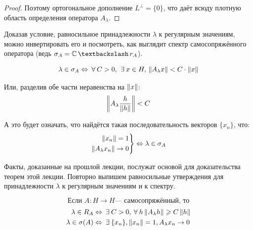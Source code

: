 \documentclass[12pt]{article}
\begin{document}
\begin{proof}
			Поэтому ортогональное дополнение $L^{\perp} = \{0\}$, что даёт всюду плотную область определения оператора $A_{\lambda}$.
		\end{proof}
	
		Доказав условие, равносильное принадлежности $\lambda$ к регулярным значениям, можно инвертировать его и посмотреть,
		как выглядит спектр самосопряжённого оператора
		(ведь $\sigma_A = \mathbb{C} \,\textbackslash\, r_A$).
	
		$$\lambda \in \sigma_A \Leftrightarrow \forall C > 0,\, \exists x \in H,\, \norm{A_{\lambda}x} < C\cdot\norm{x}$$
	
		Или, разделив обе части неравенства на $\left\| x \right\|$:
		$$\left\| A_{\lambda} \dfrac{h}{\left\| h \right\|} \right\| < C$$
	
		А это будет означать, что найдётся такая последовательность векторов $\{x_n\}$, что:
		$$
			\left.
			\begin{aligned}
				\left\| x_n \right\| = 1 \\
				\left\| A_{\lambda}x_n \right\| \rightarrow 0
			\end{aligned}
			\right\}
			\Leftrightarrow
			\lambda \in \sigma_A
		$$


		Факты, доказанные на прошлой лекции, послужат основой для доказательства теорем этой лекции.
		Повторно выпишем равносильные утверждения для принадлежности $\lambda$ к регулярным значениям и к спектру.
	
		$$\text{Если } A:H \rightarrow H \text{--- самосопряжённый, то}$$
		\begin{align}
			\lambda \in R_A       &\equals \exists C > 0, \forall h \norm{A_{\lambda}h} \geq C\norm{h} \label{eq:regCrit}\\
			\lambda \in \sigma(A) &\equals \exists\{x_n\}, \norm{x_n} = 1, A_{\lambda}x_n \rightarrow 0 \label{eq:specCrit}
		\end{align}
	
\end{document}
